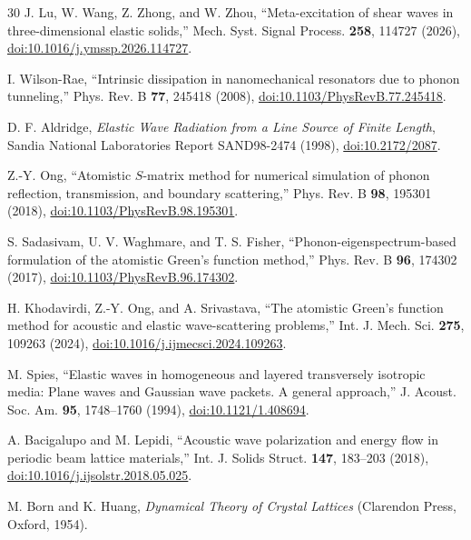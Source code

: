 \documentclass[10pt,aps,pre,reprint,floatfix,notitlepage,nofootinbib]{revtex4-2}
\begin{document}
\begin{thebibliography}{30}
J. Lu, W. Wang, Z. Zhong, and W. Zhou,
``Meta-excitation of shear waves in three-dimensional elastic solids,''
Mech. Syst. Signal Process. \textbf{258}, 114727 (2026),
\href{https://doi.org/10.1016/j.ymssp.2026.114727}{doi:10.1016/j.ymssp.2026.114727}.

I. Wilson-Rae,
``Intrinsic dissipation in nanomechanical resonators due to phonon tunneling,''
Phys. Rev. B \textbf{77}, 245418 (2008),
\href{https://doi.org/10.1103/PhysRevB.77.245418}{doi:10.1103/PhysRevB.77.245418}.

D. F. Aldridge,
\textit{Elastic Wave Radiation from a Line Source of Finite Length},
Sandia National Laboratories Report SAND98-2474 (1998),
\href{https://doi.org/10.2172/2087}{doi:10.2172/2087}.

Z.-Y. Ong,
``Atomistic $S$-matrix method for numerical simulation of phonon reflection, transmission, and boundary scattering,''
Phys. Rev. B \textbf{98}, 195301 (2018),
\href{https://doi.org/10.1103/PhysRevB.98.195301}{doi:10.1103/PhysRevB.98.195301}.

S. Sadasivam, U. V. Waghmare, and T. S. Fisher,
``Phonon-eigenspectrum-based formulation of the atomistic Green's function method,''
Phys. Rev. B \textbf{96}, 174302 (2017),
\href{https://doi.org/10.1103/PhysRevB.96.174302}{doi:10.1103/PhysRevB.96.174302}.

H. Khodavirdi, Z.-Y. Ong, and A. Srivastava,
``The atomistic Green's function method for acoustic and elastic wave-scattering problems,''
Int. J. Mech. Sci. \textbf{275}, 109263 (2024),
\href{https://doi.org/10.1016/j.ijmecsci.2024.109263}{doi:10.1016/j.ijmecsci.2024.109263}.

M. Spies,
``Elastic waves in homogeneous and layered transversely isotropic media: Plane waves and Gaussian wave packets. A general approach,''
J. Acoust. Soc. Am. \textbf{95}, 1748--1760 (1994),
\href{https://doi.org/10.1121/1.408694}{doi:10.1121/1.408694}.

A. Bacigalupo and M. Lepidi,
``Acoustic wave polarization and energy flow in periodic beam lattice materials,''
Int. J. Solids Struct. \textbf{147}, 183--203 (2018),
\href{https://doi.org/10.1016/j.ijsolstr.2018.05.025}{doi:10.1016/j.ijsolstr.2018.05.025}.

M. Born and K. Huang,
\textit{Dynamical Theory of Crystal Lattices}
(Clarendon Press, Oxford, 1954).


\end{thebibliography}
\end{document}
